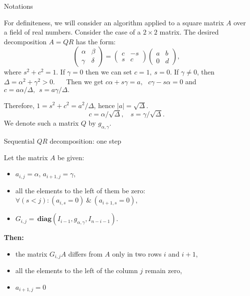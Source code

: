 \documentclass[pdf]{beamer}
\begin{document}
\begin{frame}{Notations}

 
For definiteness, we will consider an algorithm applied to a square matrix $ A $ over a field of real numbers.
 Consider the case of a $2\times 2$ matrix. The desired decomposition $ A = QR $ has the form:
 $$   \left(\begin{array}{cc}\alpha  & \beta \\  \gamma &  \delta \end{array}\right) =   \left(\begin{array}{cc}c & -s \\ s & c \end{array}\right)    \left(\begin{array}{cc}a  & b \\ 0 & d \end{array}\right) , $$
where  $ s ^ 2 + c ^ 2 = 1 $. 
  If $ \gamma = 0 $ then we can set $ c = 1, \ s = 0 $. If $ \gamma \ne 0 $, then
  $ \Delta = \alpha ^ 2 + \gamma ^ 2 > 0.  $
   Then we get
 $  c \alpha+ s \gamma=a,  \ \  \ c \gamma -s\alpha =0 $ and  
 $  c= a \alpha /\Delta,  \ \  s= a \gamma/ \Delta.   $
 
 Therefore, $ 1 = s ^ 2 + c ^ 2 = a ^ 2 / \Delta $, hence $ | a | = \sqrt {\Delta} $.
 $$  c= \alpha/ {\sqrt \Delta },  \ \ \ \  s=   \gamma/ {\sqrt \Delta }. $$
 We denote such a matrix $ Q $ by $ g _ {\alpha, \gamma} $.


 \end{frame}
\begin{frame}{Sequential $ QR $ decomposition: one step}

Let the matrix $ A $ be given: 
 \begin{itemize} 

\item $a_{i, j}=\alpha $, $ a_{i + 1, j}=\gamma $,
\item all the elements to the left of them be zero: $ \forall (s <j ) :( a_{i, s} = 0) \ \& \ (a_{i + 1, s} = 0) $,
\item     $ G_ {i, j} = \, \mathbf{diag} (I_ {i-1}, g _ {\alpha, \gamma}, I_ {n-i-1}) $.

\end{itemize}
{\bf Then: }
 \begin{itemize} \item
the matrix $ G_ {i, j} A $ differs from $ A $ 
only in two rows $ i $ and $ i + 1 $, 
\item
  all the elements to the left of the column $ j $ remain zero, 

\item$ a_{i + 1, j}=0 $
  \end{itemize}
  \end{frame}
\end{document}
